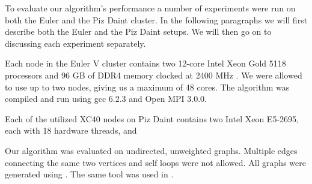 To evaluate our algorithm's performance a number of experiments were run on both the Euler and the
Piz Daint cluster. In the following paragraphs we will first describe both the Euler and the Piz
Daint setups. We will then go on to discussing each experiment separately.

Each node in the Euler V cluster contains two 12-core Intel Xeon Gold 5118 processors and 96 GB of
DDR4 memory clocked at 2400 MHz \cite{Euler}. We were allowed to use up to two nodes, giving us a
maximum of 48 cores. The algorithm was compiled and run using gcc 6.2.3 and Open MPI 3.0.0.

Each of the utilized XC40 nodes on Piz Daint contains two Intel Xeon E5-2695, each with 18 hardware threads,
and 

Our algorithm was evaluated on undirected, unweighted graphs. Multiple edges connecting the same
two vertices and self loops were not allowed. All graphs were generated using \cite{Parmat}. The same tool was used in \cite{comm_avoiding}.


